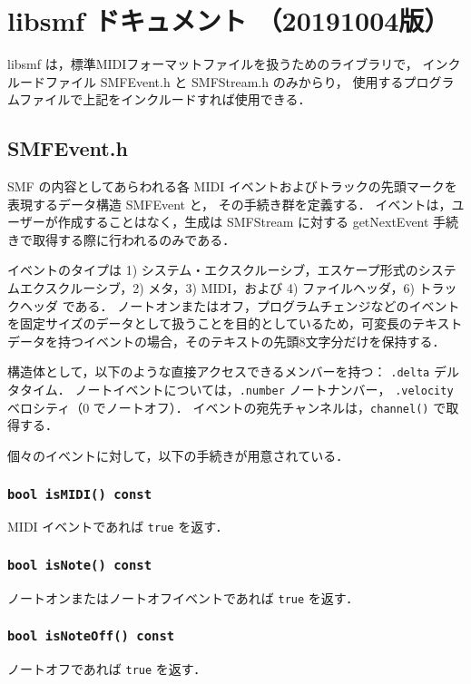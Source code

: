 \documentclass[11pt]{jreport}
\begin{document}
\section{libsmf ドキュメント （20191004版）}

libsmf は，標準MIDIフォーマットファイルを扱うためのライブラリで，
インクルードファイル SMFEvent.h と SMFStream.h のみからり，
使用するプログラムファイルで上記をインクルードすれば使用できる．

\subsection*{SMFEvent.h}
SMF の内容としてあらわれる各 MIDI イベントおよびトラックの先頭マークを表現するデータ構造 SMFEvent と，
その手続き群を定義する．
イベントは，ユーザーが作成することはなく，生成は SMFStream に対する getNextEvent 手続きで取得する際に行われるのみである．

イベントのタイプは 1) システム・エクスクルーシブ，エスケープ形式のシステムエクスクルーシブ，2) メタ，3) MIDI，および 4) ファイルヘッダ，6) トラックヘッダ である．
ノートオンまたはオフ，プログラムチェンジなどのイベントを固定サイズのデータとして扱うことを目的としているため，可変長のテキストデータを持つイベントの場合，そのテキストの先頭8文字分だけを保持する．

構造体として，以下のような直接アクセスできるメンバーを持つ：
\verb+.delta+ デルタタイム．
ノートイベントについては，\verb+.number+ ノートナンバー，
\verb+.velocity+ ベロシティ（0 でノートオフ）．
イベントの宛先チャンネルは，\verb+channel()+ で取得する．

個々のイベントに対して，以下の手続きが用意されている．

\subsubsection*{\tt bool isMIDI() const}
MIDI イベントであれば \verb+true+ を返す．

\subsubsection*{\tt bool isNote() const}
ノートオンまたはノートオフイベントであれば \verb+true+ を返す．

\subsubsection*{\tt bool isNoteOff() const}
ノートオフであれば \verb+true+ を返す．
\end{document}
